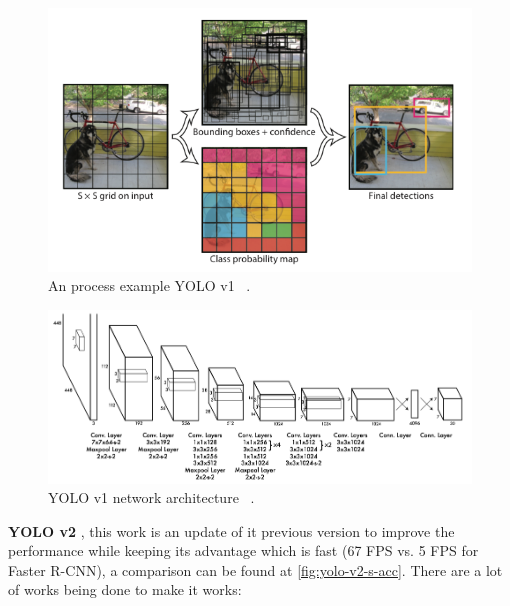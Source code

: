 \begin{figure}
    \includegraphics[width=\linewidth]{figures/yolo_v1_grid_example.png}
    \caption{An process example YOLO v1 ~\protect\cite{yolov1-paper-2015}.}
    \label{fig:yolo-v1-example}
\end{figure}

\begin{figure}
    \includegraphics[width=\linewidth]{figures/yolo_v1_network_architecture.png}
    \caption{YOLO v1 network architecture ~\protect\cite{yolov1-paper-2015}.}
    \label{fig:yolo-network}
\end{figure}

\textbf{YOLO v2} \cite{yolov2-paper-2016}, this work is an update of it
previous version to improve the performance while
keeping its advantage which is fast (67 FPS vs. 5 FPS for Faster R-CNN), a
comparison can be found at \autoref{fig:yolo-v2-s-acc}.
There are a lot of works being done to make it works:

